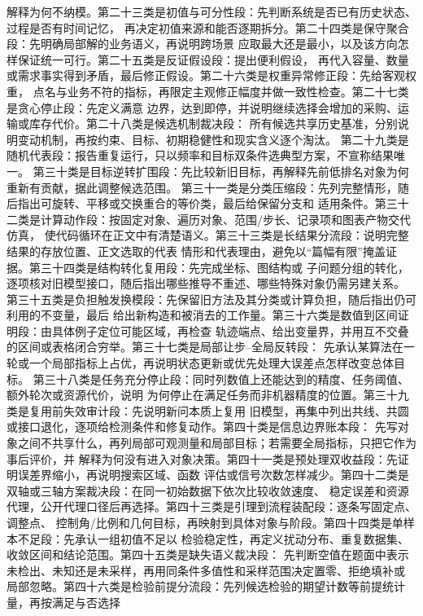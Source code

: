 \documentclass[UTF8,a4paper,12pt]{ctexart}
\begin{document}
解释为何不纳模。第二十三类是初值与可分性段：先判断系统是否已有历史状态、过程是否有时间记忆，
再决定初值来源和能否逐期拆分。第二十四类是保守聚合段：先明确局部解的业务语义，再说明跨场景
应取最大还是最小，以及该方向怎样保证统一可行。第二十五类是反证假设段：提出便利假设，
再代入容量、数量或需求事实得到矛盾，最后修正假设。第二十六类是权重异常修正段：先给客观权重，
点名与业务不符的指标，再限定主观修正幅度并做一致性检查。第二十七类是贪心停止段：先定义满意
边界，达到即停，并说明继续选择会增加的采购、运输或库存代价。第二十八类是候选机制裁决段：
所有候选共享历史基准，分别说明变动机制，再按约束、目标、初期稳健性和现实含义逐个淘汰。
第二十九类是随机代表段：报告重复运行，只以频率和目标双条件选典型方案，不宣称结果唯一。
第三十类是目标逆转扩围段：先比较新旧目标，再解释先前低排名对象为何重新有贡献，据此调整候选范围。
第三十一类是分类压缩段：先列完整情形，随后指出可旋转、平移或交换重合的等价类，最后给保留分支和
适用条件。第三十二类是计算动作段：按固定对象、遍历对象、范围/步长、记录项和图表产物交代仿真，
使代码循环在正文中有清楚语义。第三十三类是长结果分流段：说明完整结果的存放位置、正文选取的代表
情形和代表理由，避免以“篇幅有限”掩盖证据。第三十四类是结构转化复用段：先完成坐标、图结构或
子问题分组的转化，逐项核对旧模型接口，随后指出哪些推导不重述、哪些特殊对象仍需另建关系。
第三十五类是负担触发换模段：先保留旧方法及其分类或计算负担，随后指出仍可利用的不变量，最后
给出新构造和被消去的工作量。第三十六类是数值到区间证明段：由具体例子定位可能区域，再检查
轨迹端点、给出变量界，并用互不交叠的区间或表格闭合穷举。第三十七类是局部让步--全局反转段：
先承认某算法在一轮或一个局部指标上占优，再说明状态更新或优先处理大误差点怎样改变总体目标。
第三十八类是任务充分停止段：同时列数值上还能达到的精度、任务阈值、额外轮次或资源代价，说明
为何停止在满足任务而非机器精度的位置。第三十九类是复用前失效审计段：先说明新问本质上复用
旧模型，再集中列出共线、共圆或接口退化，逐项给检测条件和修复动作。第四十类是信息边界账本段：
先写对象之间不共享什么，再列局部可观测量和局部目标；若需要全局指标，只把它作为事后评价，并
解释为何没有进入对象决策。第四十一类是预处理双收益段：先证明误差界缩小，再说明搜索区域、函数
评估或信号次数怎样减少。第四十二类是双轴或三轴方案裁决段：在同一初始数据下依次比较收敛速度、
稳定误差和资源代理，公开代理口径后再选择。第四十三类是引理到流程装配段：逐条写固定点、调整点、
控制角/比例和几何目标，再映射到具体对象与阶段。第四十四类是单样本不足段：先承认一组初值不足以
检验稳定性，再定义扰动分布、重复数据集、收敛区间和结论范围。第四十五类是缺失语义裁决段：
先判断空值在题面中表示未检出、未知还是未采样，再用同条件多值性和采样范围决定置零、拒绝填补或
局部忽略。第四十六类是检验前提分流段：先列候选检验的期望计数等前提统计量，再按满足与否选择
\end{document}
